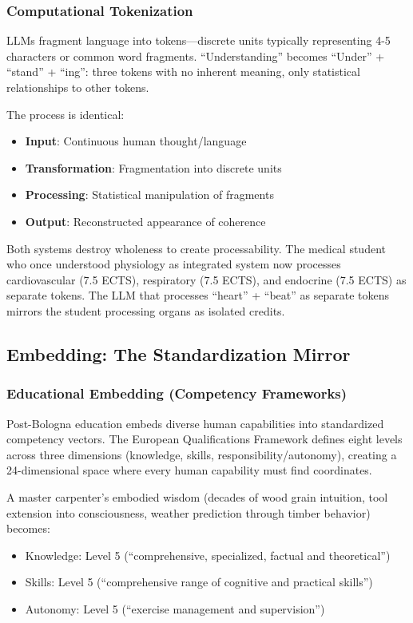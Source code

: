 \subsubsection{Computational Tokenization}

LLMs fragment language into tokens---discrete units typically representing 4-5 characters or common word fragments. ``Understanding'' becomes ``Under'' + ``stand'' + ``ing'': three tokens with no inherent meaning, only statistical relationships to other tokens.

The process is identical:
\begin{itemize}
\item \textbf{Input}: Continuous human thought/language
\item \textbf{Transformation}: Fragmentation into discrete units
\item \textbf{Processing}: Statistical manipulation of fragments
\item \textbf{Output}: Reconstructed appearance of coherence
\end{itemize}

Both systems destroy wholeness to create processability. The medical student who once understood physiology as integrated system now processes cardiovascular (7.5 ECTS), respiratory (7.5 ECTS), and endocrine (7.5 ECTS) as separate tokens. The LLM that processes ``heart'' + ``beat'' as separate tokens mirrors the student processing organs as isolated credits.

\subsection{Embedding: The Standardization Mirror}

\subsubsection{Educational Embedding (Competency Frameworks)}

Post-Bologna education embeds diverse human capabilities into standardized competency vectors. The European Qualifications Framework defines eight levels across three dimensions (knowledge, skills, responsibility/autonomy), creating a 24-dimensional space where every human capability must find coordinates.

A master carpenter's embodied wisdom (decades of wood grain intuition, tool extension into consciousness, weather prediction through timber behavior) becomes:
\begin{itemize}
\item Knowledge: Level 5 (``comprehensive, specialized, factual and theoretical'')
\item Skills: Level 5 (``comprehensive range of cognitive and practical skills'')
\item Autonomy: Level 5 (``exercise management and supervision'')
\end{itemize}

